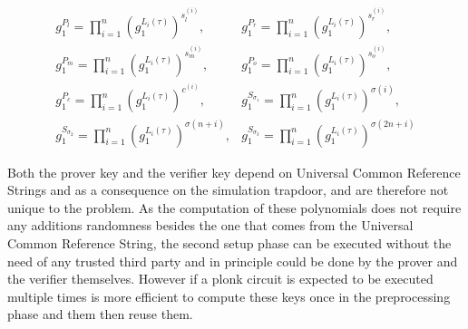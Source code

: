 \begin{equation}
\label{def:plonk-circuit-vk}
\begin{array}{ll}
g_1^{P_l} = \prod_{i=1}^{n} \left(g_1^{L_i(\tau)}\right)^{s_l^{(i)}}, & g_1^{P_r} = \prod_{i=1}^{n} \left(g_1^{L_i(\tau)}\right)^{s_r^{(i)}}, \\
g_1^{P_m} = \prod_{i=1}^{n} \left(g_1^{L_i(\tau)}\right)^{s_m^{(i)}}, & g_1^{P_o} = \prod_{i=1}^{n} \left(g_1^{L_i(\tau)}\right)^{s_o^{(i)}}, \\
g_1^{P_c} = \prod_{i=1}^{n} \left(g_1^{L_i(\tau)}\right)^{c^{(i)}}, & g_1^{S_{\sigma_1}} = \prod_{i=1}^{n} \left(g_1^{L_i(\tau)}\right)^{\sigma(i)}, \\
g_1^{S_{\sigma_2}} = \prod_{i=1}^{n} \left(g_1^{L_i(\tau)}\right)^{\sigma(n+i)}, & g_1^{S_{\sigma_3}} = \prod_{i=1}^{n} \left(g_1^{L_i(\tau)}\right)^{\sigma(2n+i)}
\end{array}
\end{equation}

Both the prover key and the verifier key depend on Universal Common Reference Strings and as a consequence on the simulation trapdoor, and are therefore not unique to the problem. As the computation of these polynomials does not require any additions randomness besides the one that comes from the Universal Common Reference String, the second setup phase can be executed without the need of any trusted third party and in principle could be done by the prover and the verifier themselves. However if a plonk circuit is expected to be executed multiple times is more efficient to compute these keys once in the preprocessing phase and them then reuse them. 

